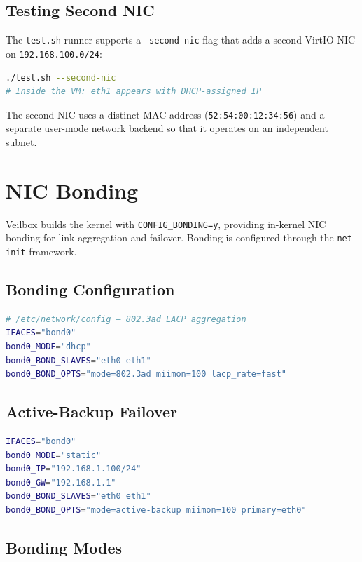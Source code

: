 \subsection{Testing Second NIC}

The \texttt{test.sh} runner supports a \texttt{--second-nic} flag that adds
a second VirtIO NIC on \texttt{192.168.100.0/24}:

\begin{lstlisting}[language=bash]
./test.sh --second-nic
# Inside the VM: eth1 appears with DHCP-assigned IP
\end{lstlisting}

The second NIC uses a distinct MAC address
(\texttt{52:54:00:12:34:56}) and a separate user-mode network backend so
that it operates on an independent subnet.

\section{NIC Bonding}

Veilbox builds the kernel with \texttt{CONFIG\_BONDING=y}, providing
in-kernel NIC bonding for link aggregation and failover. Bonding is
configured through the \texttt{net-init} framework.

\subsection{Bonding Configuration}

\begin{lstlisting}[language=bash]
# /etc/network/config — 802.3ad LACP aggregation
IFACES="bond0"
bond0_MODE="dhcp"
bond0_BOND_SLAVES="eth0 eth1"
bond0_BOND_OPTS="mode=802.3ad miimon=100 lacp_rate=fast"
\end{lstlisting}

\subsection{Active-Backup Failover}

\begin{lstlisting}[language=bash]
IFACES="bond0"
bond0_MODE="static"
bond0_IP="192.168.1.100/24"
bond0_GW="192.168.1.1"
bond0_BOND_SLAVES="eth0 eth1"
bond0_BOND_OPTS="mode=active-backup miimon=100 primary=eth0"
\end{lstlisting}

\subsection{Bonding Modes}

